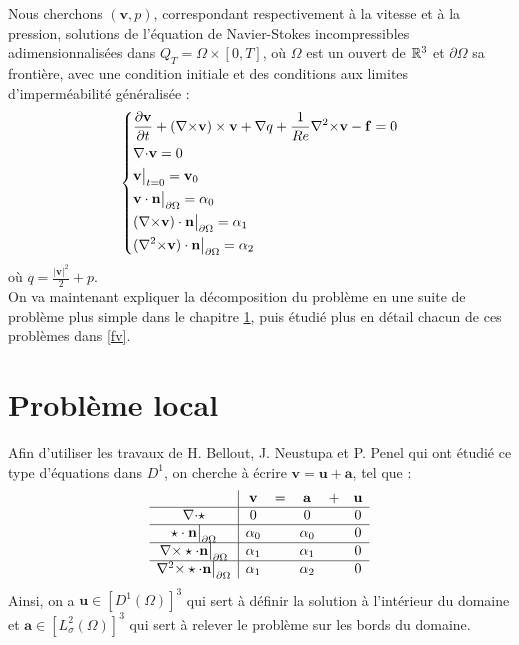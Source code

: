 Nous cherchons $(\mathbf{v},p)$, correspondant respectivement à la vitesse et à la pression, solutions de l'équation de Navier-Stokes incompressibles adimensionnalisées dans $Q_T=\Omega\times[0,T]$, où $\Omega$ est un ouvert de ${\mathbb{R}}^3$ et $\partial\Omega$ sa frontière, avec une condition initiale et des conditions aux limites d'imperméabilité généralisée :
\begin{equation}\label{depart}
\left\{\begin{aligned}
&\frac{\partial \mathbf{v}}{\partial t} + ({\nabla\times}  \mathbf{v})\times \mathbf{v} + {\nabla} q + \frac{1}{Re}{\nabla^2\times}  \mathbf{v}-\mathbf{f} = 0\\
&{\nabla\cdot} \mathbf{v} = 0\\
&\mathbf{v}\big\rvert_{t=0} = \mathbf{v}_0\\
&\mathbf{v}\cdot \mathbf{n}{\big\rvert_{\partial\Omega}} = \alpha_0\\
&({\nabla\times}  \mathbf{v})\cdot \mathbf{n}{\big\rvert_{\partial\Omega}} = \alpha_1\\
&({\nabla^2\times}  \mathbf{v})\cdot \mathbf{n}{\big\rvert_{\partial\Omega}} = \alpha_2
\end{aligned}\right.
\end{equation}
où $q = \frac{|\mathbf{v}|^2}{2}+p$.\\

On va maintenant expliquer la décomposition du problème en une suite de problème plus simple dans le chapitre \ref{local}, puis étudié plus en détail chacun de ces problèmes dans \ref{fv}.

\chapter{Problème local}
\label{local}

Afin d'utiliser les travaux de H. Bellout, J. Neustupa et P. Penel \cite{Penel2004} qui ont étudié ce type d'équations dans $D^1$, on cherche à écrire $\mathbf{v}=\mathbf{u}+\mathbf{a}$, tel que :\\
\begin{equation}\label{v}
\begin{array}{c|ccccc}
& \mathbf{v} & = & \mathbf{a} & + & \mathbf{u}\\ \hline
{\nabla\cdot}\star & 0 & & 0 & & 0\\ \hline
\star\cdot \mathbf{n}{\big\rvert_{\partial\Omega}} & \alpha_0 & & \alpha_0 & & 0\\ \hline
{\nabla\times}\star\cdot \mathbf{n}{\big\rvert_{\partial\Omega}} & \alpha_1 & & \alpha_1 & & 0\\ \hline
{\nabla^2\times}\star\cdot \mathbf{n}{\big\rvert_{\partial\Omega}} & \alpha_1 & & \alpha_2 & & 0
\end{array}
\end{equation}
Ainsi, on a $\mathbf{u}\in [D^1(\Omega)]^3$ qui sert à définir la solution à l'intérieur du domaine et $\mathbf{a}\in [L_\sigma^2(\Omega)]^3$ qui sert à relever le problème sur les bords du domaine.

